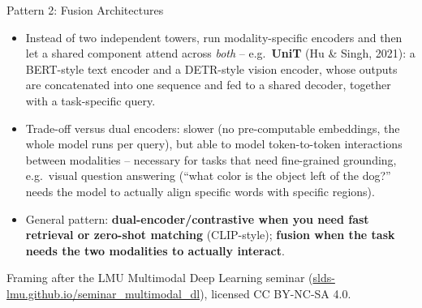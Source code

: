 \begin{vbframe}{Pattern 2: Fusion Architectures}
\begin{itemize}
  \item Instead of two independent towers, run modality-specific encoders and then let a shared component attend across \emph{both} -- e.g.\ \textbf{UniT} (Hu \& Singh, 2021): a BERT-style text encoder and a DETR-style vision encoder, whose outputs are concatenated into one sequence and fed to a shared decoder, together with a task-specific query.
  \item Trade-off versus dual encoders: slower (no pre-computable embeddings, the whole model runs per query), but able to model token-to-token interactions between modalities -- necessary for tasks that need fine-grained grounding, e.g.\ visual question answering (``what color is the object left of the dog?'' needs the model to actually align specific words with specific regions).
  \item General pattern: \textbf{dual-encoder/contrastive when you need fast retrieval or zero-shot matching} (CLIP-style); \textbf{fusion when the task needs the two modalities to actually interact}.
\end{itemize}
{\footnotesize Framing after the LMU Multimodal Deep Learning seminar (\href{https://slds-lmu.github.io/seminar_multimodal_dl/}{slds-lmu.github.io/seminar\_multimodal\_dl}), licensed CC BY-NC-SA 4.0.}
\end{vbframe}

